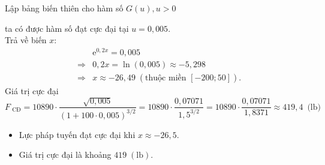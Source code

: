 \begin{bt}
{		Lập bảng biến thiên cho  hàm số $G(u), u > 0$
		\begin{center}
		\end{center}
		ta có được hàm số đạt cực  đại tại $u=0,005$.\\
		 Trả về biến $x$: \allowdisplaybreaks
		\begin{eqnarray*}
			 &&\mathrm{e}^{0,2x}=0{,}005\\
			&\Rightarrow& 0{,}2x=\ln(0{,}005)  \approx-5{,}298\\
			&\Rightarrow&  x \approx-26{,}49\;\left(\text{thuộc miền }[-200;50]\right).
		\end{eqnarray*}
		Giá trị cực đại $F_{\text{ CĐ}}=10890\cdot\dfrac{\sqrt{0{,}005}}{(1+100\cdot 0{,}005)^{3/2}}=10890\cdot\dfrac{0{,}07071}{1{,}5^{3/2}}=10890\cdot\dfrac{0{,}07071}{1{,}8371} \approx 419{,}4\,\text{  (lb)}$
		\begin{itemize}
			\item Lực pháp tuyến đạt cực đại khi $x \approx-26{,}5$. 
			\item Giá trị cực đại là khoảng $419\;(\mathrm{lb})$. 
		\end{itemize}
	} 
\end{bt}

